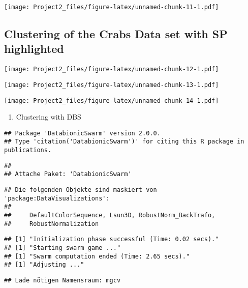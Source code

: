 \documentclass[
]{article}
\providecommand{\tightlist}{%
  \setlength{\itemsep}{0pt}\setlength{\parskip}{0pt}}
\begin{document}
\texttt{[image: Project2\_files/figure-latex/unnamed-chunk-11-1.pdf]}

\subsection{Clustering of the Crabs Data set with SP
highlighted}\label{clustering-of-the-crabs-data-set-with-sp-highlighted}

\texttt{[image: Project2\_files/figure-latex/unnamed-chunk-12-1.pdf]}

\texttt{[image: Project2\_files/figure-latex/unnamed-chunk-13-1.pdf]}

\texttt{[image: Project2\_files/figure-latex/unnamed-chunk-14-1.pdf]}

\begin{enumerate}
\def\labelenumi{\arabic{enumi}.}
\setcounter{enumi}{2}
\tightlist
\item
  Clustering with DBS
\end{enumerate}

\begin{verbatim}
## Package 'DatabionicSwarm' version 2.0.0.
## Type 'citation('DatabionicSwarm')' for citing this R package in publications.
\end{verbatim}

\begin{verbatim}
## 
## Attache Paket: 'DatabionicSwarm'
\end{verbatim}

\begin{verbatim}
## Die folgenden Objekte sind maskiert von 'package:DataVisualizations':
## 
##     DefaultColorSequence, Lsun3D, RobustNorm_BackTrafo,
##     RobustNormalization
\end{verbatim}

\begin{verbatim}
## [1] "Initialization phase successful (Time: 0.02 secs)."
## [1] "Starting swarm game ..."
## [1] "Swarm computation ended (Time: 2.65 secs)."
## [1] "Adjusting ..."
\end{verbatim}

\begin{verbatim}
## Lade nötigen Namensraum: mgcv
\end{verbatim}
\end{document}
